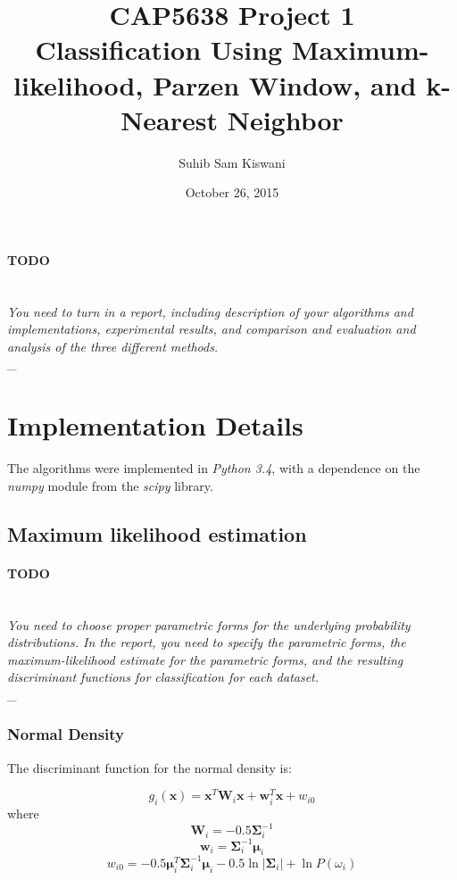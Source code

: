 \documentclass{article}
\title{
    CAP5638 Project 1\\
    \large Classification Using Maximum-likelihood, Parzen Window, and k-Nearest Neighbor
}
\author{Suhib Sam Kiswani}
\date{October 26, 2015}
\newcommand{\bx}{\mathbf{x}}
\newcommand{\bm}{\mathbf{\mu}}
\newcommand{\bsig}{\mathbf{\Sigma}}
\newcommand{\outline}[2]{\paragraph{\textsc{#1}}\hrulefill~\\{\small\it #2}\\\_\hrulefill~\\}
\newcommand{\todo}[1]{\outline{\large TODO}{#1}}
\begin{document}
\maketitle

\todo{You need to turn in a report, including description of your algorithms and implementations,
experimental results, and comparison and evaluation and analysis of the three different methods.}


\section{Implementation Details}

The algorithms were implemented in {\it Python 3.4}, with a dependence on the \textit{numpy} module from the \textit{scipy} \cite{sp} library.


\subsection{Maximum likelihood estimation}
\todo{You need to choose proper parametric forms for the underlying probability distributions. In the report, you need to specify the parametric forms, the maximum-likelihood estimate for the parametric forms, and the resulting discriminant functions for classification for each dataset.}

\subsubsection{Normal Density}
The discriminant function for the normal density is:

$$g_i(\bx) = \bx^T\mathbf{W}_i\bx + \mathbf{w}_i^T \bx + w_{i0}$$
where
$$\mathbf{W}_i = -0.5 \bsig_i^{-1}$$
$$\mathbf{w}_i = \bsig_i^{-1} \bm_i$$
$$w_{i0} = -0.5 \bm_i^T \bsig_i^{-1} \bm_i - 0.5\ln \left| \bsig_i \right| + \ln P(\omega_i)$$
\end{document}
